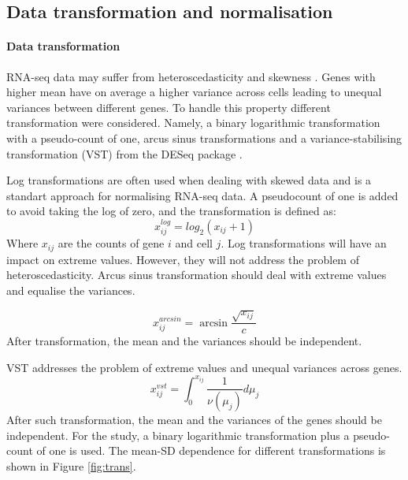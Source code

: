 \documentclass[12pt, a4paper]{article}\usepackage[]{graphicx}\usepackage[]{color}
\begin{document}
\newpage
\subsection{Data transformation and normalisation}\label{ssec:norm}
\paragraph{Data transformation}
RNA-seq data may suffer from heteroscedasticity and skewness \citep{zwiener2014transforming}. Genes with higher mean have on average a higher variance across cells leading to unequal variances between different genes. 
To handle this property different transformation were considered. Namely, a binary logarithmic transformation with a pseudo-count of one, arcus sinus transformations and a variance-stabilising transformation (VST) from the DESeq package \citep{anders2010differential}. 

Log transformations are often used when dealing with skewed data and is a standart approach for normalising RNA-seq data. A pseudocount of one is added to avoid taking the log of zero, and the transformation is defined as:
\begin{equation}
x_{ij}^{log} = log_{2}(x_{ij} + 1)
\end{equation}
Where $x_{ij}$ are the counts of gene $i$ and cell $j$. Log transformations will have an impact on extreme values. However, they will not address the problem of heteroscedasticity. Arcus sinus transformation should deal with extreme values and equalise the variances. 

\begin{equation}
x_{ij}^{arcsin} = \arcsin \frac{\sqrt{x_{ij}} }{c}
\end{equation}
After transformation, the mean and the variances should be independent. 

VST addresses the problem of extreme values and unequal variances across genes.  
\begin{equation}
x_{ij}^{vst} = \int_{0}^{x_{ij}} \frac{1}{\nu(\mu_j)} d\mu_j
\end{equation}
After such transformation, the mean and the variances of the genes should be independent. For the study, a binary logarithmic transformation plus a pseudo-count of one is used.  The mean-SD dependence for different transformations is shown in Figure \ref{fig:trans}.

\newpage
\end{document}
